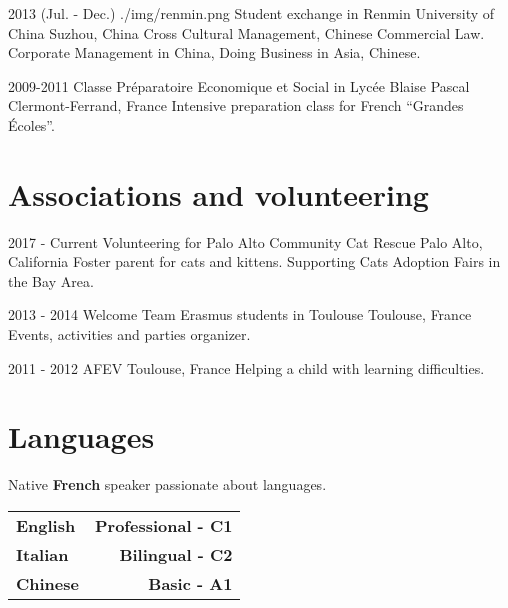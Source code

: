 \documentclass[]{cv}
\begin{document}
\begin{entrylistlogodated}
\entrylogodated
    {2013 \scriptsize{(Jul. - Dec.)}}
    {./img/renmin.png}
    {Student exchange in Renmin University of China}
    {Suzhou, China}
    {
      Cross Cultural Management, Chinese Commercial Law.\\
      Corporate Management in China, Doing Business in Asia, Chinese.
    }
\end{entrylistlogodated}

\begin{entrylistlogodated}
\entrydated
    {2009-2011}
    {Classe Pr\'eparatoire Economique et Social in Lyc\'ee Blaise Pascal}
    {Clermont-Ferrand, France}
    {
      Intensive preparation class for French ``Grandes \'Ecoles''.
    }
\end{entrylistlogodated}

\section{Associations and volunteering}
\begin{entrylistlogodated}
  \entrydated
      {2017 - Current}
      {Volunteering for Palo Alto Community Cat Rescue}
      {Palo Alto, California}
      {
        Foster parent for cats and kittens.
        Supporting Cats Adoption Fairs in the Bay Area.
      }
\end{entrylistlogodated}
\begin{entrylistlogodated}
  \entrydated
      {2013 - 2014}
      {Welcome Team Erasmus students in Toulouse}
      {Toulouse, France}
      {
        Events, activities and parties organizer.
      }
\end{entrylistlogodated}
\begin{entrylistlogodated}
  \entrydated
      {2011 - 2012}
      {AFEV}
      {Toulouse, France}
      {
        Helping a child with learning difficulties.
      }
\end{entrylistlogodated}


\section{Languages}
Native \textbf{French} speaker passionate about languages.\\
\setlength{\extrarowheight}{5pt}
\begin{tabularx}{0.42\textwidth}{X r}
  \textbf{English} & \textbf{\textcolor{airforceblue}{Professional - C1}}  \tabularnewline
  \textbf{Italian} & \textbf{\textcolor{airforceblue}{Bilingual - C2}} \tabularnewline
  \textbf{Chinese} & \textbf{\textcolor{airforceblue}{Basic - A1}} \tabularnewline
\end{tabularx}
\end{document}
